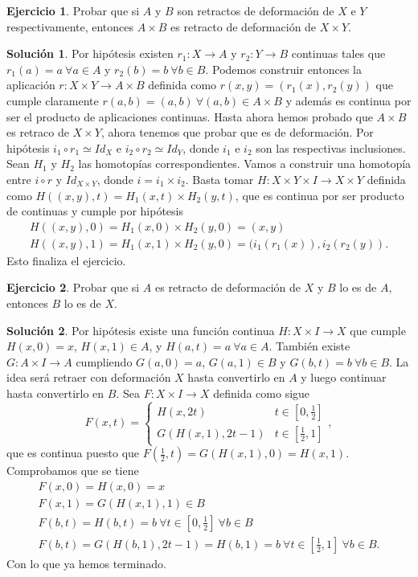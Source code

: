 \documentclass{article}
\theoremstyle{plain}
\theoremstyle{definition}
\newtheorem{exercise}{Ejercicio}
\newtheorem*{sol*}{Solución}
\begin{document}
\newpage
\begin{exercise}
Probar que si $A$ y $B$ son retractos de deformación de $X$ e $Y$ respectivamente, entonces $A\times B$ es retracto de deformación de $X\times Y$.
\end{exercise}
\begin{sol*}
Por hipótesis existen $r_1:X\to A$ y $r_2:Y\to B$ continuas tales que $r_1(a)=a\ \forall a\in A$ y $r_2(b)=b\ \forall b\in B$. Podemos construir entonces la aplicación $r:X\times Y\to A\times B$ definida como $r(x,y)=(r_1(x),r_2(y))$ que cumple claramente $r(a,b)=(a,b)\ \forall (a,b)\in A\times B$ y además es continua por ser el producto de aplicaciones continuas. Hasta ahora hemos probado que $A\times B$ es retraco de $X\times Y$, ahora tenemos que probar que es de deformación. Por hipótesis $i_1\circ r_1\simeq Id_X$ e $i_2\circ r_2\simeq Id_Y$, donde $i_1$ e $i_2$ son las respectivas inclusiones. Sean $H_1$ y $H_2$ las homotopías correspondientes. Vamos a construir una homotopía entre $i\circ r$ y $Id_{X\times Y}$, donde $i=i_1\times i_2$. Basta tomar $H:X\times Y\times I\to X\times Y$ definida como $H((x,y),t)=H_1(x,t)\times H_2(y,t)$, que es continua por ser producto de continuas y cumple por hipótesis
\begin{gather*}
H((x,y),0)=H_1(x,0)\times H_2(y,0)= (x,y)\\
H((x,y),1)=H_1(x,1)\times H_2(y,0)= (i_1(r_1(x)),i_2(r_2(y)).
\end{gather*}
Esto finaliza el ejercicio.
\end{sol*}
\newpage
\begin{exercise}
Probar que si $A$ es retracto de deformación de $X$ y $B$ lo es de $A$, entonces $B$ lo es de $X$. 
\end{exercise}
\begin{sol*}
Por hipótesis existe una función continua $H:X\times I\to X$ que cumple $H(x,0)=x$, $H(x,1)\in A$, y $H(a,t)=a\ \forall a\in A$. También existe $G:A\times I\to A$ cumpliendo $G(a,0)=a$, $G(a,1)\in B$ y $G(b,t)=b\ \forall b\in B$. La idea será retraer con deformación $X$ hasta convertirlo en $A$ y luego continuar hasta convertirlo en $B$. Sea $F:X\times I\to X$ definida como sigue
\[
F(x,t)=\begin{cases}
H(x,2t) & t\in\left[0,\frac{1}{2}\right]\\
G(H(x,1),2t-1) & t\in\left[\frac{1}{2},1\right]
\end{cases},
\]
que es continua puesto que $F(\frac{1}{2},t)=G(H(x,1),0)=H(x,1)$. Comprobamos que se tiene
\begin{gather*}
F(x,0)=H(x,0)=x\\
F(x,1)=G(H(x,1),1)\in B\\
F(b,t)=H(b,t)=b\ \forall t\in \left[0,\frac{1}{2}\right]\ \forall b\in B\\
F(b,t)=G(H(b,1),2t-1)=H(b,1)=b\ \forall t\in\left[\frac{1}{2},1\right] \ \forall b\in B.
\end{gather*}
Con lo que ya hemos terminado. 
\end{sol*}
\end{document}
